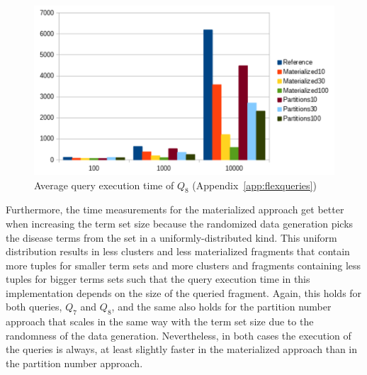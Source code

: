 \begin{figure}[h]
    \centering
    \includegraphics[scale=0.75]{charts/Query8.pdf}
    \caption{Average query execution time of $Q_8$ (Appendix~\ref{app:flexqueries})}
    \label{fig:query8}
\end{figure}

Furthermore, the time measurements
for the materialized approach get better when increasing the term set size because the randomized data generation picks the disease terms from the set 
in a uniformly-distributed kind. This uniform distribution results in less clusters and less materialized fragments that contain more tuples for smaller term 
sets and more clusters and fragments containing less tuples for bigger terms sets such that the query execution time in this implementation depends on the size
of the queried fragment. Again, this holds for both queries, $Q_7$ and $Q_8$, and the same also holds for the partition number approach that scales in the same
way with the term set size due to the randomness of the data generation. Nevertheless, in both cases the execution of the queries is always, at least slightly 
faster in the materialized approach than in the partition number approach.



